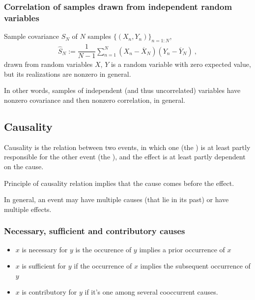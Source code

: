 \documentclass[letterpaper,10pt,english]{jupyterBook}
\begin{document}
\subsubsection{Correlation of samples drawn from independent random variables}
\label{\detokenize{code/notebooks/correlation_vs_causation:correlation-of-samples-drawn-from-independent-random-variables}}
\sphinxAtStartPar
Sample covariance \(\hat{S}_N\) of \(N\) samples \(\{ (X_n, Y_n) \}_{n=1:N}\),
\begin{equation*}
\begin{split}\hat{S}_N := \dfrac{1}{N-1} \sum_{n=1}^{N} \left(X_n - \overline{X}_N \right) \left(Y_n - \overline{Y}_N \right) \ ,\end{split}
\end{equation*}
\sphinxAtStartPar
drawn from random variables \(X\), \(Y\) is a random variable with zero expected value, but its realizations are non\sphinxhyphen{}zero in general.

\sphinxAtStartPar
In other words, samples of independent (and thus uncorrelated) variables have non\sphinxhyphen{}zero covariance and then non\sphinxhyphen{}zero correlation, in general.


\subsection{Causality}
\label{\detokenize{code/notebooks/correlation_vs_causation:causality}}
\sphinxAtStartPar
Causality is the relation between two events, in which one (the ) is \sphinxhyphen{} at least partly \sphinxhyphen{} responsible for the other event (the ), and the effect is \sphinxhyphen{} at least partly \sphinxhyphen{} dependent on the cause.

\sphinxAtStartPar
Principle of causality relation implies that the cause comes before the effect.

\sphinxAtStartPar
In general, an event may have multiple causes (that lie in its past) or have multiple effects.


\subsubsection{Necessary, sufficient and contributory causes}
\label{\detokenize{code/notebooks/correlation_vs_causation:necessary-sufficient-and-contributory-causes}}\begin{itemize}
\item {} 
\sphinxAtStartPar
\(x\) is necessary for \(y\) is the occurence of \(y\) implies a prior occurrence of \(x\)

\item {} 
\sphinxAtStartPar
\(x\) is sufficient for \(y\) if the occurrence of \(x\) implies the subsequent occurrence of \(y\)

\item {} 
\sphinxAtStartPar
\(x\) is contributory for \(y\) if it’s one among several co\sphinxhyphen{}occurrent causes.

\end{itemize}
\end{document}

